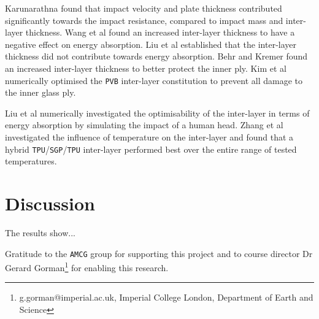\documentclass[format=acmtog,12pt,screen=true,review=false,natbib=false,]{acmart}
\begin{document}
\bigbreak
Karunarathna \cite{Kar14} found that impact velocity and plate thickness contributed significantly towards the impact resistance, compared to impact mass and inter-layer thickness. Wang et al \cite{Wan18} found an increased inter-layer thickness to have a negative effect on energy absorption. Liu et al \cite{Liu16} established that the inter-layer thickness did not contribute towards energy absorption. Behr and Kremer \cite{Beh99} found an increased inter-layer thickness to better protect the inner ply. Kim et al \cite{Kim16} numerically optimised the \texttt{PVB} inter-layer constitution to prevent all damage to the inner glass ply.

\bigbreak
Liu et al \cite{Liu16} numerically investigated the optimisability of the inter-layer in terms of energy absorption by simulating the impact of a human head. Zhang et al \cite{Zha19} investigated the influence of temperature on the inter-layer and found that a hybrid \texttt{TPU}/\texttt{SGP}/\texttt{TPU} inter-layer performed best over the entire range of tested temperatures.

\section{Discussion}

The results show...

\begin{acks}
Gratitude to the \texttt{AMCG} group for supporting this project and to course director Dr Gerard Gorman\footnote{g.gorman@imperial.ac.uk, Imperial College London, Department of Earth and Science} for enabling this research.
\end{acks}

\medskip
\printbibliography

\appendix
\setcounter{table}{0}
\renewcommand{\thetable}{\Alph{table}}
\end{document}

